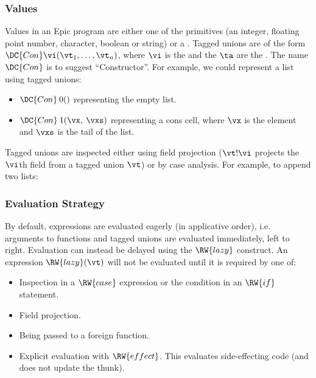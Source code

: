 \subsubsection*{Values}

Values in an Epic program are either one of the primitives (an
integer, floating point number, character, boolean or string) or a
. Tagged unions are of the form $\DC{Con}
\vi(\vt_1,\ldots,\vt_n)$, where $\vi$ is the  and the $\ta$
are the . The name $\DC{Con}$ is to suggest
``Constructor''. For example, we could represent a list using tagged
unions:

\begin{itemize}
\item $\DC{Con}\:0()$ representing the empty list.
\item $\DC{Con}\:1(\vx,\:\vxs)$ representing a cons cell, where $\vx$
  is the element and $\vxs$ is the tail of the list.
\end{itemize}

Tagged unions are inspected either using field projection ($\vt!\vi$
projects the $\vi$th field from a tagged union $\vt$) or by case
analysis. For example, to append two lists:


\subsubsection*{Evaluation Strategy}

By default, expressions are evaluated eagerly (in applicative order),
i.e. arguments to functions and tagged unions are evaluated
immediately, left to right. Evaluation can instead be delayed using
the $\RW{lazy}$ construct. An expression $\RW{lazy}(\vt)$ will not be
evaluated until it is required by one of:

\begin{itemize}
\item Inspection in a $\RW{case}$ expression or the condition in an
  $\RW{if}$ statement.
\item Field projection.
\item Being passed to a foreign function.
\item Explicit evaluation with $\RW{effect}$. This evaluates
  side-effecting code (and does not update the thunk).
\end{itemize}

